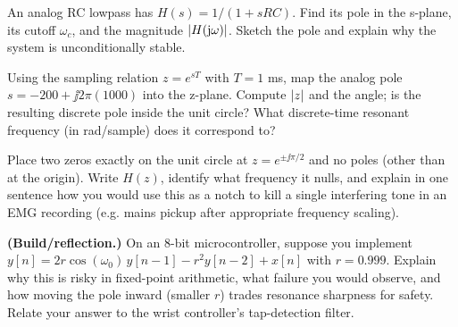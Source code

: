 \begin{exercise}
An analog RC lowpass has $H(s)=1/(1+sRC)$. Find its pole in the s-plane, its cutoff
$\omega_c$, and the magnitude $\lvert H(\mathrm{j}\omega)\rvert$. Sketch the pole and explain why the
system is unconditionally stable.
\end{exercise}

\begin{exercise}
Using the sampling relation $z=e^{sT}$ with $T=1$ ms, map the analog pole $s=-200+\jj
2\pi(1000)$ into the z-plane. Compute $\lvert z\rvert$ and the angle; is the resulting discrete
pole inside the unit circle? What discrete-time resonant frequency (in rad/sample) does it
correspond to?
\end{exercise}

\begin{exercise}
Place two zeros exactly on the unit circle at $z=e^{\pm\jj\pi/2}$ and no poles (other than
at the origin). Write $H(z)$, identify what frequency it nulls, and explain in one
sentence how you would use this as a notch to kill a single interfering tone in an EMG
recording (e.g. mains pickup after appropriate frequency scaling).
\end{exercise}

\begin{exercise}
\textbf{(Build/reflection.)} On an 8-bit microcontroller, suppose you implement
$y[n]=2r\cos(\omega_0)\,y[n-1]\allowbreak-r^2 y[n-2]+x[n]$ with $r=0.999$. Explain why this is risky
in fixed-point arithmetic, what failure you would observe, and how moving the pole inward
(smaller $r$) trades resonance sharpness for safety. Relate your answer to the wrist
controller's tap-detection filter.
\end{exercise}

